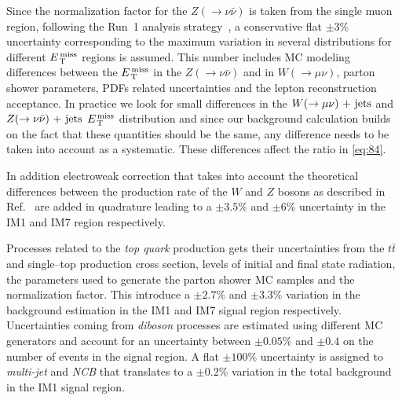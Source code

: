 Since the normalization factor for the $Z(\rightarrow \nu \bar{\nu})$ is taken
from the single muon region, following the Run~1 analysis
strategy~\cite{RunIPaper}, a conservative flat $\pm 3\%$ uncertainty
corresponding to the maximum variation in several distributions for different
$E_\mathrm{\, T}^\mathrm{\, miss}$ regions is assumed. This number includes MC modeling differences between
the $E_\mathrm{\, T}^\mathrm{\, miss}$ in the $Z(\rightarrow \nu \bar{\nu})$ and in
$W(\rightarrow \mu \nu)$, parton shower parameters, PDFs related uncertainties
and the lepton reconstruction acceptance. In practice we look for small
differences in the $W (\rightarrow \mu \nu)\mathrm{~+~jets}$ and $Z (\rightarrow \nu \bar{\nu})\mathrm{~+~jets}$ $E_\mathrm{\, T}^\mathrm{\, miss}$ distribution and
since our background calculation builds on the fact that these quantities should
be the same, any difference needs to be taken into account as a
systematic. These differences affect the ratio in \cref{eq:84}.

In addition electroweak correction that takes into account the theoretical
differences between the production rate of the $W$ and $Z$ bosons as described
in Ref.~\cite{EWCorrections} are added in quadrature leading to a $\pm 3.5\%$
and $\pm 6\%$ uncertainty in the IM1 and IM7 region respectively.

Processes related to the \emph{top quark} production gets their uncertainties
from the $t \bar{t}$ and single--top production cross section, levels of initial
and final state radiation, the parameters used to generate the parton shower MC
samples and the normalization factor. This introduce a $\pm 2.7\%$ and
$\pm 3.3 \%$ variation in the background estimation in the IM1 and IM7 signal
region respectively. Uncertainties coming from \emph{diboson} processes are
estimated using different MC generators and account for an uncertainty between
$\pm 0.05\%$ and $\pm 0.4$ on the number of events in the signal region. A flat
$\pm 100\%$ uncertainty is assigned to \emph{multi-jet} and \emph{NCB} that
translates to a $\pm 0.2\%$ variation in the total background in the IM1 signal
region.
